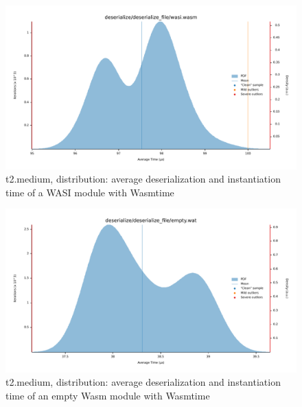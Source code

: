 \begin{figure}[H]
    \centering
        \includegraphics[width=1\linewidth]{images/benches/t2_medium_deserialize_file_wasi.pdf}
    \caption{t2.medium, distribution: average deserialization and instantiation time of a WASI module with Wasmtime}
    \label{fig:bench:instantiation:t2-deserialize-wasi-wasm}
\end{figure}

\begin{figure}[H]
    \centering
        \includegraphics[width=1\linewidth]{images/benches/t2_medium_deserialize_file_empty.pdf}
    \caption{t2.medium, distribution: average deserialization and instantiation time of an empty Wasm module with Wasmtime}
    \label{fig:bench:instantiation:t2-deserialize-empty-wasm}
\end{figure}


